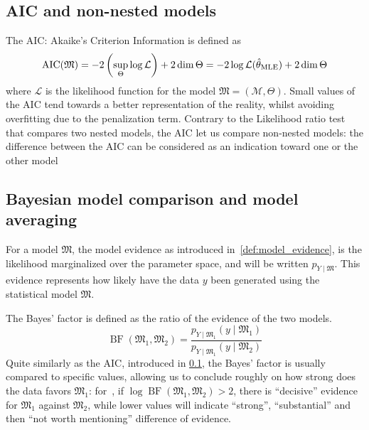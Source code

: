 \documentclass[../../Main_ManuscritThese.tex]{subfiles}
\begin{document}
\subsection{AIC and non-nested models}
\label{sec:AIC_crit}
The AIC: Akaike's Criterion Information is defined as
\begin{equation}
  \mathop{\mathrm{AIC}}(\mathfrak{M}) = -2\left(\sup_{\Theta} \log \mathcal{L}\right) + 2 \mathop{\mathrm{dim}} \Theta = -2\log \mathcal{L}(\hat{\theta}_{\mathrm{MLE}}) + 2 \mathop{\mathrm{dim}} \Theta
\end{equation}
where $\mathcal{L}$ is the likelihood function for the model $\mathfrak{M} = (\mathcal{M},\Theta)$.
Small values of the AIC tend towards a better representation of the reality, whilst avoiding overfitting due to the penalization term.
Contrary to the Likelihood ratio test that compares two nested models, the AIC let us compare non-nested models: the difference between the AIC can be considered as an indication toward one or the other model~\cite{burnham_multimodel_2004}
\subsection{Bayesian model comparison and model averaging}
For a model $\mathfrak{M}$, the model evidence as introduced in~\cref{def:model_evidence}, is the likelihood marginalized over the parameter space, and will be written $p_{Y\mid \mathfrak{M}}$. This evidence represents how likely have the data $y$ been generated using the statistical model $\mathfrak{M}$.

The Bayes' factor is defined as the ratio of the evidence of the two models.
\begin{equation}
  \label{eq:bayes_factor}
  \mathop{\mathrm{BF}}(\mathfrak{M}_1,\mathfrak{M}_2)= \frac{p_{Y\mid \mathfrak{M}_1}(y \mid \mathfrak{M}_1) }{p_{Y\mid \mathfrak{M}_1}(y \mid \mathfrak{M}_2)}
\end{equation}
Quite similarly as the AIC, introduced in \cref{sec:AIC_crit}, the Bayes' factor is usually compared to specific values, allowing us to conclude roughly on how strong does the data favors $\mathfrak{M}_1$: for~\cite{kass_bayes_1995}, if $\log\mathop{\mathrm{BF}}(\mathfrak{M}_1,\mathfrak{M}_2)>2$, there is ``decisive'' evidence for $\mathfrak{M}_1$ against $\mathfrak{M}_2$, while lower values will indicate ``strong'', ``substantial'' and then ``not worth mentioning'' difference of evidence.
\end{document}
